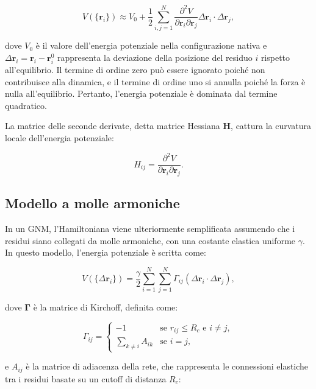 \documentclass[Lau,binding=0.6cm,oneside,noexaminfo]{sapthesis}
\begin{document}
\begin{equation}
V(\{\mathbf{r}_i\}) \approx V_0 + \frac{1}{2} \sum_{i,j=1}^N \frac{\partial^2 V}{\partial \mathbf{r}_i \partial \mathbf{r}_j} \Delta \mathbf{r}_i \cdot \Delta \mathbf{r}_j,
\end{equation}

dove $V_0$ è il valore dell'energia potenziale nella configurazione nativa e $\Delta \mathbf{r}_i = \mathbf{r}_i - \mathbf{r}_i^0$ rappresenta la deviazione della posizione del residuo $i$ rispetto all'equilibrio. Il termine di ordine zero può essere ignorato poiché non contribuisce alla dinamica, e il termine di ordine uno si annulla poiché la forza è nulla all'equilibrio. Pertanto, l'energia potenziale è dominata dal termine quadratico.

La matrice delle seconde derivate, detta matrice Hessiana $\mathbf{H}$, cattura la curvatura locale dell'energia potenziale:

\begin{equation}
H_{ij} = \frac{\partial^2 V}{\partial \mathbf{r}_i \partial \mathbf{r}_j}.
\end{equation}

\subsection*{Modello a molle armoniche}
In un GNM, l'Hamiltoniana viene ulteriormente semplificata assumendo che i residui siano collegati da molle armoniche, con una costante elastica uniforme $\gamma$. In questo modello, l'energia potenziale è scritta come:

\begin{equation}
V(\{\Delta \mathbf{r}_i\}) = \frac{\gamma}{2} \sum_{i=1}^N \sum_{j=1}^N \Gamma_{ij} (\Delta \mathbf{r}_i \cdot \Delta \mathbf{r}_j),
\end{equation}

dove $\mathbf{\Gamma}$ è la matrice di Kirchoff, definita come:

\begin{equation}
\Gamma_{ij} =
\begin{cases}
-1 & \text{se } r_{ij} \leq R_c \text{ e } i \neq j, \\
\sum_{k \neq i} A_{ik} & \text{se } i = j,
\end{cases}
\end{equation}

e $A_{ij}$ è la matrice di adiacenza della rete, che rappresenta le connessioni elastiche tra i residui basate su un cutoff di distanza $R_c$:
\end{document}
